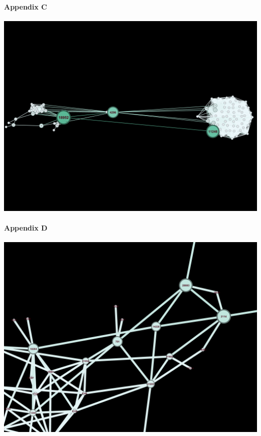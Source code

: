 \documentclass[11pt,twocolumn]{article}
\begin{document}
\paragraph{Appendix C\newline\newline\newline\newline\newline}
\includegraphics[scale=0.22]{betweennesscentraility_tvshow.png}
\paragraph{Appendix D\newline\newline\newline\newline\newline}
\includegraphics[scale=0.22]{betweennesscentraility_com.png}
\end{document}
